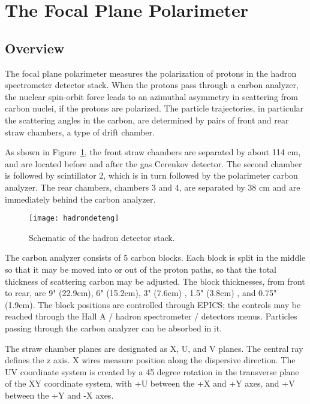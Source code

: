 \section{The Focal Plane Polarimeter}

\subsection{Overview}

The focal plane polarimeter measures the polarization of protons in the
hadron spectrometer detector stack.
When the protons pass through a carbon analyzer, the nuclear spin-orbit
force leads to an azimuthal asymmetry in scattering from carbon nuclei,
if the protons are polarized. 
The particle trajectories, in particular the
scattering angles in the carbon, are determined by pairs of front and rear
straw chambers, a type of drift chamber.

As shown in Figure~\ref{fig:hadron_det}, 
the front straw chambers are separated by about 114 cm, and are located
before and after the gas Cerenkov detector.
The second chamber is followed by scintillator 2, which is in turn
followed by the polarimeter carbon analyzer.
The rear chambers, chambers 3 and 4, are separated by 38 cm and are
immediately behind the carbon analyzer.

\begin{figure}[bth]
\begin{center}
\texttt{[image: hadrondeteng]}
{\linespread{1.}
\caption[Detectors: Hadron Arm detector]{Schematic of the hadron detector stack.}
\label{fig:hadron_det}}
\end{center}
\end{figure}

The carbon analyzer consists of 5 carbon blocks.
Each block is split in the middle so that it may be moved into or out
of the proton paths, so that the total thickness of scattering carbon may be
adjusted.
The block thicknesses, from front to rear, are 9" (22.9cm), 6" (15.2cm), 
3" (7.6cm) , 1.5" (3.8cm) , and 0.75" (1.9cm).
The block positions are controlled through EPICS; the controls
may be reached through the Hall A / hadron spectrometer / detectors menus.
Particles passing through the carbon analyzer can be absorbed in it.

The straw chamber planes are designated as X, U, and V planes.
The central ray defines the z axis.
X wires measure position along the dispersive direction.
The UV coordinate system is created by a 45 degree rotation in the
transverse plane of the XY coordinate system, with +U between the
+X and +Y axes, and +V between the +Y and -X axes.

